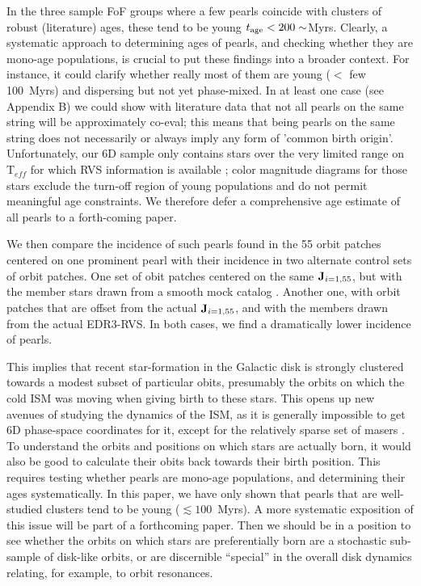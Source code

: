 \documentclass[twocolumn]{aastex631}
\begin{document}
In the three sample FoF groups where a few pearls coincide with clusters of robust (literature) ages, these tend to be young $t_{\rm age}<200 \sim$Myrs. Clearly, a systematic approach to determining ages of pearls, and checking whether they are mono-age populations, is crucial to put these findings into a broader context. For instance, it could clarify whether really most of them are young ($<$ few 100~Myrs) and dispersing but not yet phase-mixed. In at least one case (see Appendix B) we could show with literature data that not all pearls on the same string will be approximately co-eval; this means that being pearls on the same string does not necessarily or always imply any form of 'common birth origin'. Unfortunately, our 6D sample only contains stars over the very limited range on T$_{eff}$ for which RVS information is available \citep{Rybizki2021}; color magnitude diagrams for those stars exclude the turn-off region of young populations and do not permit meaningful age constraints. We therefore defer a comprehensive age estimate of all pearls to a forth-coming paper.


We then compare the incidence of such pearls found in the 55 orbit patches centered on one prominent pearl with their incidence in two alternate control sets of orbit patches. One set of obit patches centered on the same ${\bf J}_{i=1,55}$, but with the member stars drawn from a smooth mock catalog \citep{2018PASP..130g4101R}. Another one, with orbit patches that are offset from the actual ${\bf J}_{i=1,55}$, and with the members drawn from the actual EDR3-RVS. In both cases, we find a dramatically lower incidence of pearls.

This implies that recent star-formation in the Galactic disk is strongly clustered towards a modest subset of particular obits, presumably the orbits on which the cold ISM was moving when giving birth to these stars. This opens up new avenues of studying the dynamics of the ISM, as it is generally impossible to get 6D phase-space coordinates for it, except for the relatively sparse set of masers \citep{2014ApJ...783..130R}.
To understand the orbits and positions on which stars are actually born, it would also be good to calculate their obits back towards their birth position. This requires testing whether pearls are mono-age populations, and determining their ages systematically. In this paper, we have only shown that pearls that are well-studied clusters tend to be young ($\lesssim 100$~Myrs). A more systematic exposition of this issue will be part of a forthcoming paper. Then we should be in a position to see whether the orbits on which stars are preferentially born are a stochastic sub-sample of disk-like orbits, or are discernible ``special'' in the overall disk dynamics relating, for example, to orbit resonances.
\end{document}
